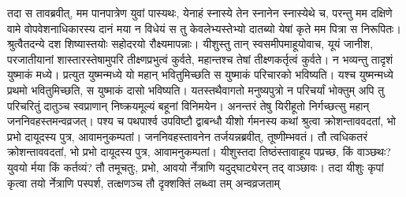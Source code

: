 \vakya तदा स तावब्रवीत्, मम पानपात्रेण युवां पास्यथः, येनाहं स्नास्ये तेन स्नानेन स्नास्येथे च, परन्तु मम दक्षिणे वामे वोपवेशनाधिकारस्य दानं मया न विधेयं स तु केवलेभ्यस्तेभ्यो दातब्यो येषां कृते मम पित्रा स निरूपितः।
\vakya श्रुत्वैतदन्ये दश शिष्यास्तयोः सहोदरयो रौक्ष्यमापन्नाः।
\vakya यीशुस्तु तान् स्वसमीपमाहूयोवाच, यूयं जानीश, परजातीयानां शास्तारस्तेषामुपरि तीक्ष्णप्रभुत्वं कुर्वते, महान्तश्च तेषां तीक्ष्णकर्तृत्वं कुर्वते।
\vakya न भव्यन्तु तादृशं युष्माकं मध्ये। प्रत्युत युष्मन्मध्ये यो महान् भवितुमिच्छति स युष्माकं परिचारको भविष्यति।
\vakya यश्च युष्मन्मध्ये प्रथमो भवितुमिच्छति, स युष्माकं दासो भविष्यति।
\vakya यतस्तथैवागतो मनुष्यपुत्रो न परिचर्यां भोक्तुम् अपि तु परिचरितुं दातुञ्च स्वप्राणान् निष्क्रयमूल्यं बहूनां विनिमयेन।
\vakya अनन्तरं तेषु यिरीहूतो निर्गच्छत्सु महान् जननिवहस्तमन्वव्रजत्।
\vakya पश्य च पथपार्श्व उपविष्टौ द्वाबन्धौ यीशो र्गमनस्य कथां श्रुत्वा क्रोशन्ताववदतां, भो प्रभो दायूदस्य पुत्र, आवामनुकम्पतां।
\vakya जननिवहस्तावनेन तर्जयन्नब्रवीत्, तूष्णीम्भवतं। तौ त्वधिकतरं क्रोशन्ताववदतां, भो प्रभो दायूदस्य पुत्र, आवामनुकम्पतां।
\vakya यीशुस्तदा तिष्ठंस्तावाहूय पप्रच्छ, किं वाञ्छथः? युवयो र्मया किं कर्तव्यं?
\vakya तौ तमूचतुः, प्रभो, आवयो र्नेत्राणि यदुद्घाट्येरन् तद् वाञ्छावः।
\vakya तदा यीशुः कृपां कृत्वा तयो र्नेत्राणि पस्पर्श, तत्क्षणञ्च तौ दृक्शक्तिं लब्ध्वा तम् अन्वव्रजताम्\eoc